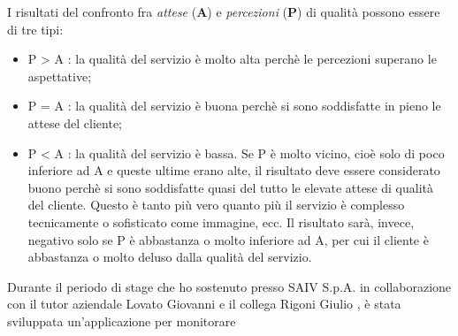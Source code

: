 I risultati del confronto fra \textit{attese} (\textbf{A}) e \textit{percezioni}
(\textbf{P}) di qualità possono essere di tre tipi:
\begin{itemize}
  \item P > A : la qualità del servizio è molto alta perchè le
  percezioni superano le aspettative;
  \item P = A : la qualità del servizio è buona perchè si sono soddisfatte
  in pieno le attese del cliente;
  \item P < A : la qualità del servizio è bassa. Se P è
  molto vicino, cioè solo di poco inferiore ad A e queste ultime erano
  alte, il risultato deve essere considerato buono perchè si sono soddisfatte
  quasi del tutto le elevate attese di qualità del cliente. Questo è tanto
  più vero quanto più il servizio è complesso tecnicamente o sofisticato come
  immagine, ecc. Il risultato sarà, invece, negativo solo se P è abbastanza o
  molto inferiore ad A, per cui il cliente è abbastanza o molto deluso dalla
  qualità del servizio.
\end{itemize}

Durante il periodo di stage che ho sostenuto presso SAIV S.p.A.
in collaborazione con il tutor aziendale Lovato Giovanni e il collega Rigoni
Giulio , è stata sviluppata un'applicazione per monitorare 



